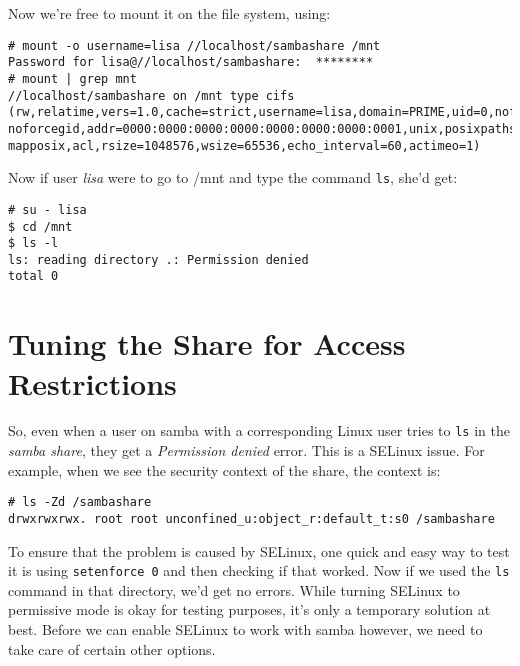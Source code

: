 \noindent
Now we're free to mount it on the file system, using:

\vspace{-15pt}
\begin{verbatim}
# mount -o username=lisa //localhost/sambashare /mnt
Password for lisa@//localhost/sambashare:  ********
# mount | grep mnt
//localhost/sambashare on /mnt type cifs (rw,relatime,vers=1.0,cache=strict,username=lisa,domain=PRIME,uid=0,noforceuid,gid=0, noforcegid,addr=0000:0000:0000:0000:0000:0000:0000:0001,unix,posixpaths,serverino, mapposix,acl,rsize=1048576,wsize=65536,echo_interval=60,actimeo=1)
\end{verbatim}
\vspace{-10pt}	

\noindent
Now if user \textit{lisa} were to go to /mnt and type the command \verb|ls|, she'd get:

\vspace{-15pt}
\begin{verbatim}
# su - lisa
$ cd /mnt
$ ls -l
ls: reading directory .: Permission denied
total 0
\end{verbatim}
\vspace{-10pt}

\section{Tuning the Share for Access Restrictions}
So, even when a user on samba with a corresponding Linux user tries to \verb|ls| in the \textit{samba share}, they get a \textit{Permission denied} error. This is a SELinux issue. For example, when we see the security context of the share, the context is:

\vspace{-15pt}
\begin{verbatim}
# ls -Zd /sambashare
drwxrwxrwx. root root unconfined_u:object_r:default_t:s0 /sambashare
\end{verbatim}
\vspace{-10pt}	

\noindent
To ensure that the problem is caused by SELinux, one quick and easy way to test it is using \verb|setenforce 0| and then checking if that worked. Now if we used the \verb|ls| command in that directory, we'd get no errors. While turning SELinux to permissive mode is okay for testing purposes, it's only a temporary solution at best. Before we can enable SELinux to work with samba however, we need to take care of certain other options.

